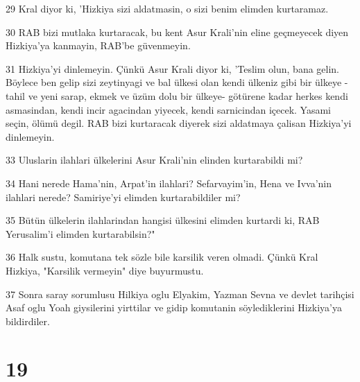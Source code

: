 \par 29 Kral diyor ki, 'Hizkiya sizi aldatmasin, o sizi benim elimden kurtaramaz.
\par 30 RAB bizi mutlaka kurtaracak, bu kent Asur Krali'nin eline geçmeyecek diyen Hizkiya'ya kanmayin, RAB'be güvenmeyin.
\par 31 Hizkiya'yi dinlemeyin. Çünkü Asur Krali diyor ki, 'Teslim olun, bana gelin. Böylece ben gelip sizi zeytinyagi ve bal ülkesi olan kendi ülkeniz gibi bir ülkeye -tahil ve yeni sarap, ekmek ve üzüm dolu bir ülkeye- götürene kadar herkes kendi asmasindan, kendi incir agacindan yiyecek, kendi sarnicindan içecek. Yasami seçin, ölümü degil. RAB bizi kurtaracak diyerek sizi aldatmaya çalisan Hizkiya'yi dinlemeyin.
\par 33 Uluslarin ilahlari ülkelerini Asur Krali'nin elinden kurtarabildi mi?
\par 34 Hani nerede Hama'nin, Arpat'in ilahlari? Sefarvayim'in, Hena ve Ivva'nin ilahlari nerede? Samiriye'yi elimden kurtarabildiler mi?
\par 35 Bütün ülkelerin ilahlarindan hangisi ülkesini elimden kurtardi ki, RAB Yerusalim'i elimden kurtarabilsin?"
\par 36 Halk sustu, komutana tek sözle bile karsilik veren olmadi. Çünkü Kral Hizkiya, "Karsilik vermeyin" diye buyurmustu.
\par 37 Sonra saray sorumlusu Hilkiya oglu Elyakim, Yazman Sevna ve devlet tarihçisi Asaf oglu Yoah giysilerini yirttilar ve gidip komutanin söylediklerini Hizkiya'ya bildirdiler.

\chapter{19}

